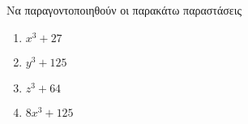 Να παραγοντοποιηθούν οι παρακάτω παραστάσεις
\begin{multicols}{2}
\begin{enumerate}[label=\roman*.]
\item $ x^3+27 $
\item $ y^3+125 $
\item $ z^3+64 $
\item $ 8x^3+125 $
\end{enumerate}
\end{multicols}
